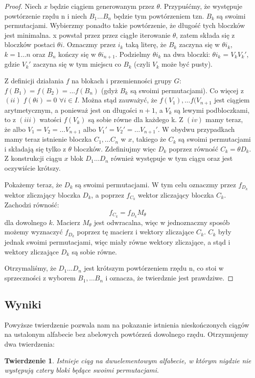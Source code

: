\documentclass[12pt,a4paper]{amsart}
\newtheorem{theorem}{Twierdzenie}
\begin{document}
\begin{proof}
Niech $x$ będzie ciągiem generowanym przez $\theta$. Przypuśćmy, że występuje powtórzenie rzędu n i niech $B_1 \dots B_n$ będzie tym powtórzeniem tzn. $B_k$ są swoimi permutacjami. Wybierzmy ponadto takie powtórzenie, że długość tych bloczków jest minimalna. x powstał przez przez ciągłe iterowanie $\theta$, zatem składa się z bloczków postaci $\theta i$. Oznaczmy przez $i_k$ taką literę, że $B_k$ zaczyna się w $\theta i_k$, $k=1 \dots n$ oraz $B_n$ kończy się w $\theta i_{n+1}$. Podzielmy $\theta i_k$ na dwa bloczki: $\theta i_k$ = $V_k V_k'$, gdzie $V_k'$ zaczyna się w tym miejscu co $B_k$ (czyli $V_k$ może być pusty). 

Z definicji działania $f$ na blokach i przemienności grupy $G$: $f(B_1)=f(B_2)= \dots f(B_n)$ (gdyż $B_k$ są swoimi permutacjami). Co więcej z $(ii)$ $f(\theta i)=0$ $\forall i \in I$. Można stąd zauważyć, że $f(V_1), \dots f(V_{n+1}$ jest ciągiem arytmetycznym, a ponieważ jest on długości $n+1$, a $V_k$ są lewymi podbloczkami, to z $(iii)$ watości $f(V_k)$ są sobie równe dla każdego k. Z $(iv)$ mamy teraz, że albo $V_1=V_2= \dots V_{n+1}$ albo $V_1'=V_2'= \dots V_{n+1}'$. W obydwu przypadkach mamy teraz istnienie bloczka $C_1,\dots C_n$ w $x$, takiego że $C_k$ są swoimi permutacjami i składają się tylko z $\theta$ bloczków. Zdefiniujmy więc $D_k$ poprzez równość $C_k = \theta D_k$. Z konstrukcji ciągu $x$ blok $D_1 \dots D_n$ również występuje w tym ciągu oraz jest oczywiście krótszy.

Pokażemy teraz, że $D_k$ są swoimi permutacjami. W tym celu oznaczmy przez $f_{D_k}$ wektor zliczający bloczka $D_k$, a poprzez $f_{C_k}$ wektor zliczający bloczka $C_k$. Zachodzi równość:
\begin{equation}
f_{C_k} = f_{D_k} M_{\theta}
\end{equation}
dla dowolnego $k$. Macierz $M_{\theta}$ jest odwracalna, więc w jednoznaczny sposób możemy wyznaczyć $f_{D_k}$ poprzez tę macierz i wektory zliczające $C_k$. $C_k$ były jednak swoimi permutacjami, więc miały równe wektory zliczające, a stąd i wektory zliczające $D_k$ są sobie równe.

Otrzymaliśmy, że $D_1 \dots D_n$ jest krótszym powtórzeniem rzędu n, co stoi w sprzeczności z wyborem $B_1,\dots B_n$ i oznacza, że twierdznie jest prawdziwe.

\end{proof}

\subsection{Wyniki}
Powyższe twierdzenie pozwala nam na pokazanie istnienia nieskończonych ciągów na ustalonym alfabecie bez abelowych powtórzeń dowolnego rzędu. Otrzymujemy dwa twierdzenia:
\begin{theorem}
Istnieje ciąg na dwuelementowym alfabecie, w którym nigdzie nie występują cztery bloki będące swoimi permutacjami.
\end{theorem}
\end{document}
